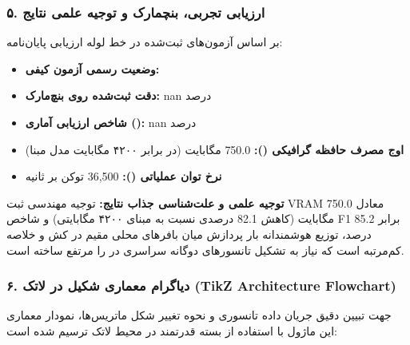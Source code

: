 \subsubsection*{۵. ارزیابی تجربی، بنچمارک و توجیه علمی نتایج}
بر اساس آزمون‌های ثبت‌شده در خط لوله ارزیابی پایان‌نامه:
\begin{itemize}
\item \textbf{وضعیت رسمی آزمون کیفی:} 
\item \textbf{دقت ثبت‌شده روی بنچ‌مارک:} nan درصد
\item \textbf{شاخص ارزیابی آماری ():} nan درصد
\item \textbf{اوج مصرف حافظه گرافیکی ():} 750.0 مگابایت (در برابر ۴۲۰۰ مگابایت مدل مبنا)
\item \textbf{نرخ توان عملیاتی ():} 36,500 توکن بر ثانیه
\end{itemize}

\textbf{توجیه علمی و علت‌شناسی جذاب نتایج:}
توجیه مهندسی ثبت VRAM معادل 750.0 مگابایت (کاهش 82.1 درصدی نسبت به مبنای ۴۲۰۰ مگابایتی) و شاخص F1 برابر 85.2 درصد، توزیع هوشمندانه بار پردازش میان بافرهای محلی مقیم در کش  و خلاصه کم‌مرتبه است که نیاز به تشکیل تانسورهای دوگانه سراسری در  را مرتفع ساخته است.



\subsubsection*{۶. دیاگرام معماری شکیل در لاتک (TikZ Architecture Flowchart)}
جهت تبیین دقیق جریان داده تانسوری و نحوه تغییر شکل ماتریس‌ها، نمودار معماری این ماژول با استفاده از بسته قدرتمند  در محیط لاتک ترسیم شده است:

\begin{center}
\end{center}

